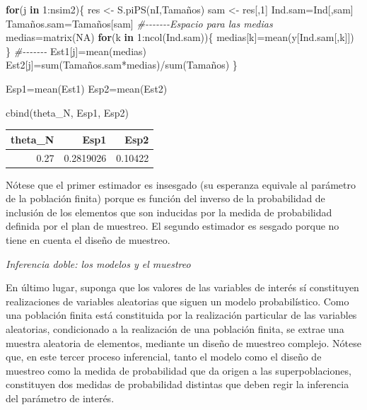 \documentclass[
  12pt,
]{book}
\newenvironment{Shaded}{\begin{snugshade}}{\end{snugshade}}
\newcommand{\CommentTok}[1]{\textcolor[rgb]{0.56,0.35,0.01}{\textit{#1}}}
\newcommand{\ConstantTok}[1]{\textcolor[rgb]{0.00,0.00,0.00}{#1}}
\newcommand{\ControlFlowTok}[1]{\textcolor[rgb]{0.13,0.29,0.53}{\textbf{#1}}}
\newcommand{\DecValTok}[1]{\textcolor[rgb]{0.00,0.00,0.81}{#1}}
\newcommand{\FunctionTok}[1]{\textcolor[rgb]{0.00,0.00,0.00}{#1}}
\newcommand{\NormalTok}[1]{#1}
\newcommand{\OtherTok}[1]{\textcolor[rgb]{0.56,0.35,0.01}{#1}}
\newcommand{\SpecialCharTok}[1]{\textcolor[rgb]{0.00,0.00,0.00}{#1}}
\begin{document}
\begin{Shaded}
\begin{Highlighting}[]
\ControlFlowTok{for}\NormalTok{(j }\ControlFlowTok{in} \DecValTok{1}\SpecialCharTok{:}\NormalTok{nsim2)\{}
\NormalTok{res }\OtherTok{\textless{}{-}} \FunctionTok{S.piPS}\NormalTok{(nI,Tamaños)}
\NormalTok{sam }\OtherTok{\textless{}{-}}\NormalTok{ res[,}\DecValTok{1}\NormalTok{] }
\NormalTok{Ind.sam}\OtherTok{=}\NormalTok{Ind[,sam]}
\NormalTok{Tamaños.sam}\OtherTok{=}\NormalTok{Tamaños[sam]}
\CommentTok{\#{-}{-}{-}{-}{-}{-}{-}Espacio para las medias}
\NormalTok{medias}\OtherTok{=}\FunctionTok{matrix}\NormalTok{(}\ConstantTok{NA}\NormalTok{)}
\ControlFlowTok{for}\NormalTok{(k }\ControlFlowTok{in} \DecValTok{1}\SpecialCharTok{:}\FunctionTok{ncol}\NormalTok{(Ind.sam))\{}
\NormalTok{medias[k]}\OtherTok{=}\FunctionTok{mean}\NormalTok{(y[Ind.sam[,k]])}
\NormalTok{\}}
\CommentTok{\#{-}{-}{-}{-}{-}{-}{-}}
\NormalTok{Est1[j]}\OtherTok{=}\FunctionTok{mean}\NormalTok{(medias)}
\NormalTok{Est2[j]}\OtherTok{=}\FunctionTok{sum}\NormalTok{(Tamaños.sam}\SpecialCharTok{*}\NormalTok{medias)}\SpecialCharTok{/}\FunctionTok{sum}\NormalTok{(Tamaños)}
\NormalTok{\}}

\NormalTok{Esp1}\OtherTok{=}\FunctionTok{mean}\NormalTok{(Est1)}
\NormalTok{Esp2}\OtherTok{=}\FunctionTok{mean}\NormalTok{(Est2)}

\FunctionTok{cbind}\NormalTok{(theta\_N, Esp1, Esp2)}
\end{Highlighting}
\end{Shaded}

\begin{tabular}{r|r|r}
\hline
theta\_N & Esp1 & Esp2\\
\hline
0.27 & 0.2819026 & 0.10422\\
\hline
\end{tabular}

Nótese que el primer estimador es insesgado (su esperanza equivale al parámetro de la población finita) porque es función del inverso de la probabilidad de inclusión de los elementos que son inducidas por la medida de probabilidad definida por el plan de muestreo. El segundo estimador es sesgado porque no tiene en cuenta el diseño de muestreo.

\emph{Inferencia doble: los modelos y el muestreo}

En último lugar, suponga que los valores de las variables de interés sí constituyen realizaciones de variables aleatorias que siguen un modelo probabilístico. Como una población finita está constituida por la realización particular de las variables aleatorias, condicionado a la realización de una población finita, se extrae una muestra aleatoria de elementos, mediante un diseño de muestreo complejo. Nótese que, en este tercer proceso inferencial, tanto el modelo como el diseño de muestreo como la medida de probabilidad que da origen a las superpoblaciones, constituyen dos medidas de probabilidad distintas que deben regir la inferencia del parámetro de interés.
\end{document}
